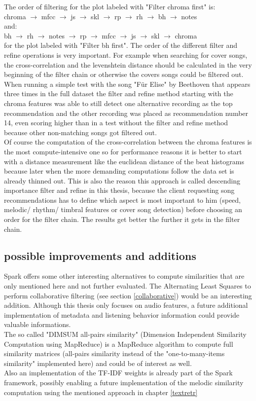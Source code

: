 \noindent The order of filtering for the plot labeled with "Filter chroma first" is:\\
chroma $\rightarrow$ mfcc  $\rightarrow$ js  $\rightarrow$ skl $\rightarrow$ rp  $\rightarrow$ rh  $\rightarrow$ bh  $\rightarrow$ notes\\ 
and:\\
bh $\rightarrow$ rh $\rightarrow$ notes $\rightarrow$ rp $\rightarrow$ mfcc $\rightarrow$ js $\rightarrow$ skl $\rightarrow$ chroma\\
for the plot labeled with "Filter bh first". 
\noindent The order of the different filter and refine operations is very important. For example when searching for cover songs, the cross-correlation and the levenshtein distance should be calculated in the very beginning of the filter chain or otherwise the covers songs could be filtered out. When running a simple test with the song "Für Elise" by Beethoven that appears three times in the full dataset the filter and refine method starting with the chroma features was able to still detect one alternative recording as the top recommendation and the other recording was placed as recommendation number 14, even scoring higher than in a test without the filter and refine method because other non-matching songs got filtered out.\\
Of course the computation of the cross-correlation between the chroma features is the most compute-intensive one so for performance reasons it is better to start with a distance measurement like the euclidean distance of the beat histograms because later when the more demanding computations follow the data set is already thinned out. 
This is also the reason this approach is called descending importance filter and refine in this thesis, because the client requesting song recommendations has to define which aspect is most important to him (speed, melodic/ rhythm/ timbral features or cover song detection) before choosing an order for the filter chain. The results get better the further it gets in the filter chain.  

\subsection{possible improvements and additions}

Spark offers some other interesting alternatives to compute similarities that are only mentioned here and not further evaluated.  
The Alternating Least Squares to perform collaborative filtering (see section \ref{collaborative}) would be an interesting addition. Although this thesis only focuses on audio features, a future additional implementation of metadata and listening behavior information could provide valuable informations.\\ 
The so called "DIMSUM all-pairs similarity" (Dimension Independent Similarity Computation using MapReduce) is a MapReduce algorithm to compute full similarity matrices (all-pairs similarity instead of the "one-to-many-items similarity" implemented here) and could be of interest as well.\\
Also an implementation of the TF-IDF weights is already part of the Spark framework, possibly enabling a future implementation of the melodic similarity computation using the mentioned approach in chapter \ref{textretr}
